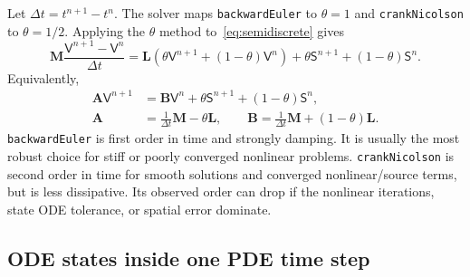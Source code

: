 \documentclass[11pt,a4paper]{article}
\newcommand{\code}[1]{\texttt{\small #1}}
\newcommand{\Mmass}{\mathbf{M}}
\newcommand{\Lop}{\mathbf{L}}
\newcommand{\Aimp}{\mathbf{A}}
\newcommand{\Bimp}{\mathbf{B}}
\begin{document}
Let $\Delta t=t^{n+1}-t^n$. The solver maps \code{backwardEuler} to
$\theta=1$ and \code{crankNicolson} to $\theta=1/2$. Applying the
$\theta$ method to~\eqref{eq:semidiscrete} gives
\begin{equation}
  \Mmass\frac{\mathsf{V}^{n+1}-\mathsf{V}^{n}}{\Delta t}
  =
  \Lop\left(\theta\mathsf{V}^{n+1}+(1-\theta)\mathsf{V}^{n}\right)
  +
  \theta\mathsf{S}^{n+1}
  +(1-\theta)\mathsf{S}^{n}.
  \label{eq:theta}
\end{equation}
Equivalently,
\begin{align}
  \Aimp \mathsf{V}^{n+1}
  &=
  \Bimp \mathsf{V}^{n}
  +\theta\mathsf{S}^{n+1}
  +(1-\theta)\mathsf{S}^{n},
  \label{eq:implicit-system}\\
  \Aimp &= \frac{1}{\Delta t}\Mmass-\theta\Lop,\qquad
  \Bimp = \frac{1}{\Delta t}\Mmass+(1-\theta)\Lop.
\end{align}
\code{backwardEuler} is first order in time and strongly damping. It is usually
the most robust choice for stiff or poorly converged nonlinear problems.
\code{crankNicolson} is second order in time for smooth solutions and converged
nonlinear/source terms, but is less dissipative. Its observed order can drop if
the nonlinear iterations, state ODE tolerance, or spatial error dominate.

\subsection{ODE states inside one PDE time step}
\end{document}
